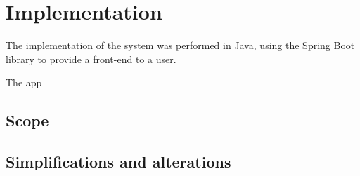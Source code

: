 \section{Implementation}

The implementation of the system was performed in Java, using the Spring Boot library to provide a front-end to a user. 

The app

\subsection{Scope}

\subsection{Simplifications and alterations}
